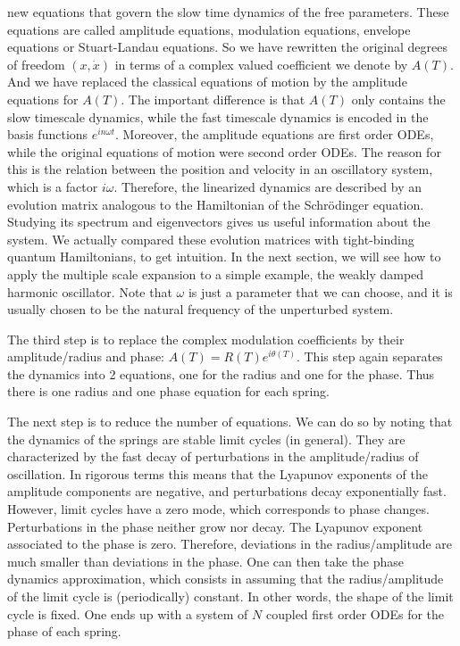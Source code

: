 \documentclass[11pt, a4paper]{article} %
\newcommand{\xd}{\dot{x}}
\newcommand{\Th}{\theta}
\begin{document}
new equations that govern the slow time dynamics of the free parameters. These equations are called amplitude equations, 
modulation equations, envelope equations or Stuart-Landau equations. 
So we have rewritten the original degrees of freedom  $(x,\xd)$ in terms of a complex valued coefficient we denote by $A(T)$.
And we have replaced the classical equations of motion by the amplitude equations for $A(T)$. 
The important difference is that $A(T)$ only contains the slow timescale dynamics, 
while the fast timescale dynamics is encoded in the basis functions $e^{in\omega t}$.
Moreover, the amplitude equations are first order ODEs, while the original equations of motion were second order ODEs.
The reason for this is the relation between the position and velocity in an oscillatory system, which is a factor $i \omega$.
Therefore, the linearized dynamics are described by an evolution matrix analogous to the Hamiltonian of the Schrödinger 
equation. Studying its spectrum and eigenvectors gives us useful information about the system. We actually 
compared these evolution matrices with tight-binding quantum Hamiltonians, to get intuition. 
In the next section, we will see how to apply the multiple scale expansion to a simple example, the weakly damped harmonic oscillator.
Note that $\omega$ is just a parameter that we can choose, and it is usually chosen to be the natural frequency of the unperturbed system.


The third step is to replace the complex modulation coefficients by their amplitude/radius and phase: $A(T) = R(T)e^{i\Th(T)}$. 
This step again separates the dynamics into 2 equations, one for the radius and one for the phase. Thus there is one radius and 
one phase equation for each spring.  


The next step is to reduce the number of equations. We can do so by noting that the dynamics of the springs are stable limit cycles (in general). 
They are characterized by the fast decay of perturbations in the amplitude/radius of oscillation. 
In rigorous terms this means that the Lyapunov exponents of the amplitude components are negative, and perturbations 
decay exponentially fast. However, limit cycles have a zero mode, which corresponds to phase changes. Perturbations in the 
phase neither grow nor decay. The Lyapunov exponent associated to the phase is zero. Therefore, 
deviations in the radius/amplitude are much smaller than deviations in the phase. One can then take the 
phase dynamics approximation, which consists in assuming that the radius/amplitude of the limit cycle is (periodically) constant.
In other words, the shape of the limit cycle is fixed. One ends up with a system of $N$ coupled first order ODEs 
for the phase of each spring. 
\end{document}
